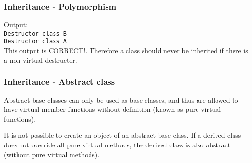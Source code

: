 \begin{frame}[fragile]
\frametitle{Inheritance - Polymorphism}
{\tiny

Output:\\
\verb|Destructor class B|\\
\verb|Destructor class A|\\
This output is CORRECT!. Therefore a class should never be inherited if there is
a non-virtual destructor.
}
\end{frame}

\begin{frame}[fragile]
\frametitle{Inheritance - Abstract class}
{\tiny
Abstract base classes can only be used as base classes, and thus are allowed to have virtual member functions
without definition (known as pure virtual functions).

It is not possible to create an object of an abstract base class. If a derived class does not
override all pure virtual methods, the derived class is also abstract (without pure virtual
methods).
}
\end{frame}
